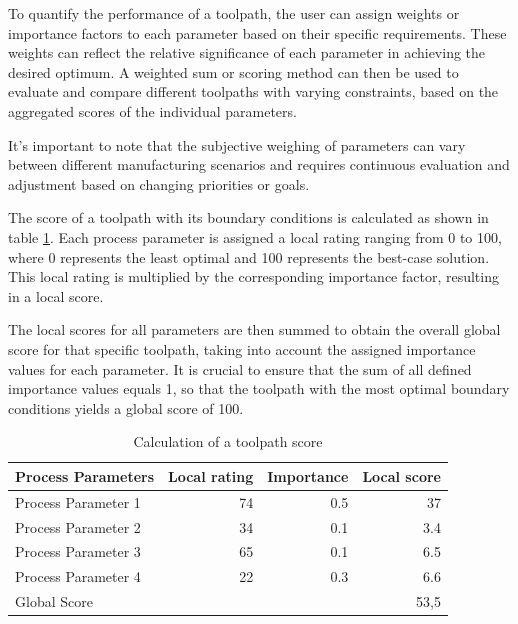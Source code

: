 To quantify the performance of a toolpath, the user can assign weights or importance factors to each parameter based on their specific requirements. These weights can reflect the relative significance of each parameter in achieving the desired optimum. A weighted sum or scoring method can then be used to evaluate and compare different toolpaths with varying constraints, based on the aggregated scores of the individual parameters. %

It's important to note that the subjective weighing of parameters can vary between different manufacturing scenarios and requires continuous evaluation and adjustment based on changing priorities or goals.

The score of a toolpath with its boundary conditions is calculated as shown in table \ref{weighting}. Each process parameter is assigned a local rating ranging from 0 to 100, where 0 represents the least optimal and 100 represents the best-case solution. This local rating is multiplied by the corresponding importance factor, resulting in a local score.

The local scores for all parameters are then summed to obtain the overall global score for that specific toolpath, taking into account the assigned importance values for each parameter. It is crucial to ensure that the sum of all defined importance values equals 1, so that the toolpath with the most optimal boundary conditions yields a global score of 100.

\begin{table}[H]
	\centering
	\begin{tabular}{||l|r|r|r||}
		Process Parameters & Local rating & Importance & Local score\\
		\hline
		\hline
		\hline
		
		Process Parameter 1 & 74 & 0.5 & 37\\
		Process Parameter 2 & 34& 0.1&3.4\\
		Process Parameter 3& 65& 0.1&6.5\\
		Process Parameter 4& 22&0.3&6.6\\
		\hline
		\hline
		\hline
		Global Score& & &53,5\\
		\hline
		\hline
	\end{tabular}
	
	\caption{Calculation of a toolpath score}
	\label{weighting}
\end{table}


